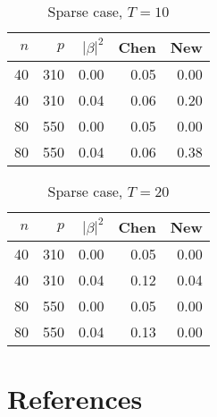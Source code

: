\documentclass[review]{elsarticle}
\theoremstyle{plain}
\theoremstyle{definition}
\theoremstyle{remark}
\begin{document}
\begin{table}[ht]
    \centering
    \begin{tabular}{rrrrr}
          \hline
          $n$ & $p$ & $|\beta|^2$ & Chen & New \\ 
            \hline
            40 & 310 & 0.00 & 0.05 & 0.00 \\ 
              40 & 310 & 0.04 & 0.06 & 0.20 \\ 
                80 & 550 & 0.00 & 0.05 & 0.00 \\ 
                  80 & 550 & 0.04 & 0.06 & 0.38 \\ 
                             \hline
    \end{tabular}
    \caption{Sparse case, $T=10$}
\end{table}


\begin{table}[ht]
    \centering
    \begin{tabular}{rrrrr}
          \hline
          $n$ & $p$ & $|\beta|^2$ & Chen & New \\ 
            \hline
            40 & 310 & 0.00 & 0.05 & 0.00 \\ 
              40 & 310 & 0.04 & 0.12 & 0.04 \\ 
                80 & 550 & 0.00 & 0.05 & 0.00 \\ 
                  80 & 550 & 0.04 & 0.13 & 0.00 \\ 
                             \hline
    \end{tabular}
    \caption{Sparse case, $T=20$}
\end{table}

\section*{References}

\end{document}
